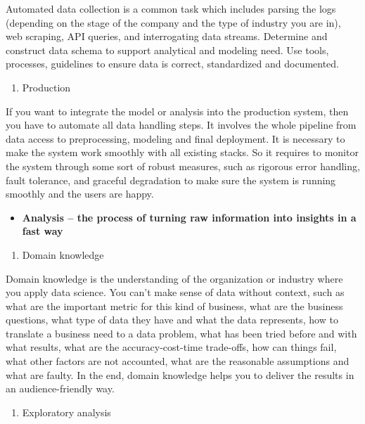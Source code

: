 \documentclass[12pt,]{krantz}
\providecommand{\tightlist}{%
  \setlength{\itemsep}{0pt}\setlength{\parskip}{0pt}}
\theoremstyle{definition}
\theoremstyle{definition}
\theoremstyle{definition}
\theoremstyle{remark}
\begin{document}
Automated data collection is a common task which includes parsing the
logs (depending on the stage of the company and the type of industry you
are in), web scraping, API queries, and interrogating data streams.
Determine and construct data schema to support analytical and modeling
need. Use tools, processes, guidelines to ensure data is correct,
standardized and documented.

\begin{enumerate}
\def\labelenumi{(\arabic{enumi})}
\setcounter{enumi}{2}
\tightlist
\item
  Production
\end{enumerate}

If you want to integrate the model or analysis into the production
system, then you have to automate all data handling steps. It involves
the whole pipeline from data access to preprocessing, modeling and final
deployment. It is necessary to make the system work smoothly with all
existing stacks. So it requires to monitor the system through some sort
of robust measures, such as rigorous error handling, fault tolerance,
and graceful degradation to make sure the system is running smoothly and
the users are happy.

\begin{itemize}
\tightlist
\item
  \textbf{Analysis -- the process of turning raw information into
  insights in a fast way}
\end{itemize}

\begin{enumerate}
\def\labelenumi{(\arabic{enumi})}
\tightlist
\item
  Domain knowledge
\end{enumerate}

Domain knowledge is the understanding of the organization or industry
where you apply data science. You can't make sense of data without
context, such as what are the important metric for this kind of
business, what are the business questions, what type of data they have
and what the data represents, how to translate a business need to a data
problem, what has been tried before and with what results, what are the
accuracy-cost-time trade-offs, how can things fail, what other factors
are not accounted, what are the reasonable assumptions and what are
faulty. In the end, domain knowledge helps you to deliver the results in
an audience-friendly way.

\begin{enumerate}
\def\labelenumi{(\arabic{enumi})}
\setcounter{enumi}{1}
\tightlist
\item
  Exploratory analysis
\end{enumerate}
\end{document}
